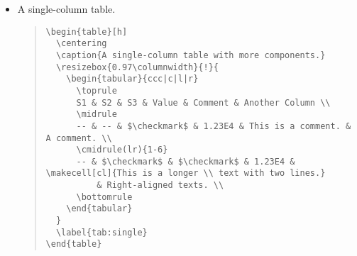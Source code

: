 \begin{itemize}
  \item A single-column table.
  \begin{quote}\begin{scriptsize}\begin{verbatim}
\begin{table}[h]
  \centering
  \caption{A single-column table with more components.}
  \resizebox{0.97\columnwidth}{!}{
    \begin{tabular}{ccc|c|l|r}
      \toprule
      S1 & S2 & S3 & Value & Comment & Another Column \\
      \midrule
      -- & -- & $\checkmark$ & 1.23E4 & This is a comment. & A comment. \\
      \cmidrule(lr){1-6}
      -- & $\checkmark$ & $\checkmark$ & 1.23E4 & \makecell[cl]{This is a longer \\ text with two lines.}
          & Right-aligned texts. \\
      \bottomrule
    \end{tabular}
  }
  \label{tab:single}
\end{table}
  \end{verbatim}\end{scriptsize}\end{quote}

\end{itemize}

\twocolumn







